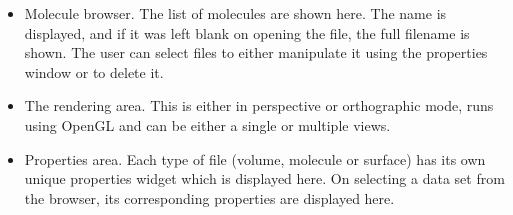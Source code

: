 \begin{itemize}

\item Molecule browser. The list of molecules are shown here. The
name is displayed, and if it was left blank on opening the file, the
full filename is shown. The user can select files to either
manipulate it using the properties window or to delete it.

\item The rendering area. This is either in perspective or
orthographic mode, runs using OpenGL and can be either a single or
multiple views.

\item Properties area. Each type of file  (volume, molecule or
surface) has its own unique properties widget which is displayed
here. On selecting a data set from the browser, its corresponding
properties are displayed here.

\end{itemize}
